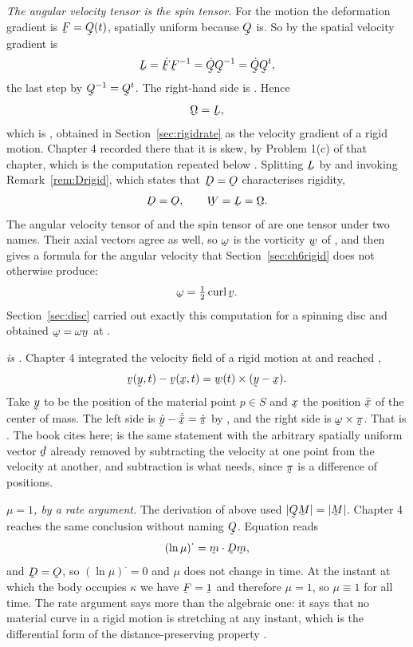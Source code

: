 \emph{The angular velocity tensor is the spin tensor.} For the motion
 the deformation gradient is $\bF=\bQ(t)$, spatially uniform
because $\bQ$ is. So by  the spatial velocity gradient is
\[
   \bL=\dot\bF\bF^{-1}=\dot\bQ\bQ^{-1}=\dot\bQ\bQ^{t} ,
\]
the last step by $\bQ^{-1}=\bQ^{t}$. The right-hand side is .
Hence
\[
   \bOm=\bL ,
\]
which is , obtained in Section~\ref{sec:rigidrate} as the
velocity gradient of a rigid motion. Chapter 4 recorded there that it is
skew, by Problem 1(c) of that chapter, which is the computation repeated
below . Splitting $\bL$ by  and invoking
Remark~\ref{rem:Drigid}, which states that $\bD=\Ob$ characterises
rigidity,
\[
   \bD=\Ob ,\qquad \bW=\bL=\bOm .
\]
The angular velocity tensor of  and the spin tensor of
 are one tensor under two names. Their axial vectors agree as
well, so $\bom$ is the vorticity $\bw$ of , and 
then gives a formula for the angular velocity that
Section~\ref{sec:ch6rigid} does not otherwise produce:
\[
   \bom=\tfrac12\crl\bv .
\]
Section~\ref{sec:disc} carried out exactly this computation for a
spinning disc and obtained $\bom=\omega\bn$ at .

\emph{ is .} Chapter 4 integrated the velocity field
of a rigid motion at  and reached ,
\[
   \bv(\by,t)-\bv(\bx,t)=\bw(t)\times(\by-\bx) .
\]
Take $\by$ to be the position of the material point $p\in S$ and $\bx$
the position $\bar{\bx}$ of the center of mass. The left side is
$\dot\by-\dot{\bar{\bx}}=\dot{\vek\pi}$ by , and the right
side is $\bom\times\vek\pi$. That is . The book cites
 here;  is the same statement with the arbitrary
spatially uniform vector $\bd$ already removed by subtracting the
velocity at one point from the velocity at another, and subtraction is
what  needs, since $\vek\pi$ is a difference of positions.

\emph{$\mu=1$, by a rate argument.} The derivation of  above
used $|\bQ\bM|=|\bM|$. Chapter 4 reaches the same conclusion without
naming $\bQ$. Equation  reads
\[
   (\ln\mu)^{\textstyle\cdot}=\ip\bm{\bD\bm} ,
\]
and $\bD=\Ob$, so $(\ln\mu)^{\textstyle\cdot}=0$ and $\mu$ does not
change in time. At the instant at which the body occupies $\kappa$ we
have $\bF=\shift$ and therefore $\mu=1$, so $\mu\equiv1$ for all time.
The rate argument says more than the algebraic one: it says that no
material curve in a rigid motion is stretching at any instant, which is
the differential form of the distance-preserving property .


